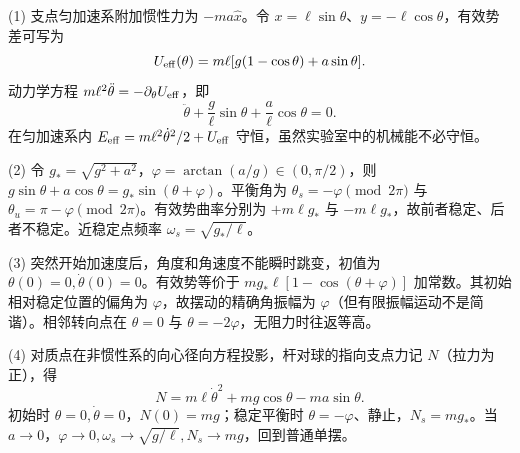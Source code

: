(1) 支点匀加速系附加惯性力为 \(-ma\hat x\)。令 \(x=\ell\sin\theta\)、\(y=-\ell\cos\theta\)，有效势差可写为
\[
U_{\rm eff}(\theta)=m\ell[g(1-\cos\theta)+a\sin\theta].
\]
动力学方程 \(m\ell^2\ddot\theta=-\partial_\theta U_{\rm eff}\)，即
\[
\ddot\theta+\frac g\ell\sin\theta+\frac a\ell\cos\theta=0.
\]
在匀加速系内 \(E_{\rm eff}=m\ell^2\dot\theta^2/2+U_{\rm eff}\) 守恒，虽然实验室中的机械能不必守恒。

(2) 令 \(g_*=\sqrt{g^2+a^2}\)，\(\varphi=\arctan(a/g)\in(0,\pi/2)\)，则 \(g\sin\theta+a\cos\theta=g_*\sin(\theta+\varphi)\)。平衡角为 \(\theta_s=-\varphi\pmod{2\pi}\) 与 \(\theta_u=\pi-\varphi\pmod{2\pi}\)。有效势曲率分别为 \(+m\ell g_*\) 与 \(-m\ell g_*\)，故前者稳定、后者不稳定。近稳定点频率 \(\omega_s=\sqrt{g_*/\ell}\)。

(3) 突然开始加速度后，角度和角速度不能瞬时跳变，初值为 \(\theta(0)=0,\dot\theta(0)=0\)。有效势等价于 \(mg_*\ell[1-\cos(\theta+\varphi)]\) 加常数。其初始相对稳定位置的偏角为 \(\varphi\)，故摆动的精确角振幅为 \(\varphi\)（但有限振幅运动不是简谐）。相邻转向点在 \(\theta=0\) 与 \(\theta=-2\varphi\)，无阻力时往返等高。

(4) 对质点在非惯性系的向心径向方程投影，杆对球的指向支点力记 \(N\)（拉力为正），得
\[
N=m\ell\dot\theta^2+mg\cos\theta-ma\sin\theta.
\]
初始时 \(\theta=0,\dot\theta=0\)，\(N(0)=mg\)；稳定平衡时 \(\theta=-\varphi\)、静止，\(N_s=mg_*\)。当 \(a\to0\)，\(\varphi\to0,\omega_s\to\sqrt{g/\ell},N_s\to mg\)，回到普通单摆。
